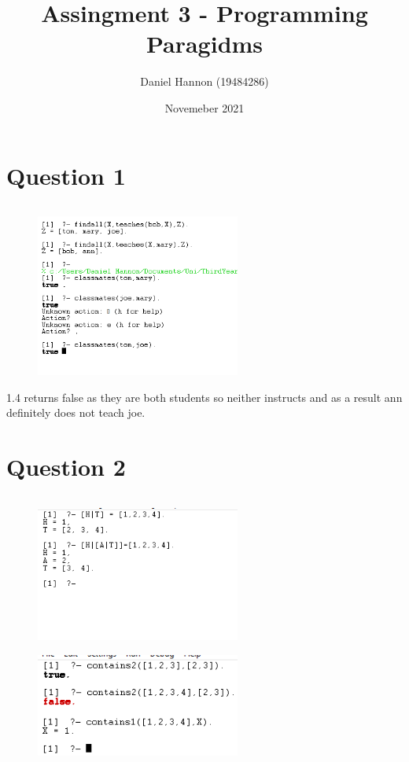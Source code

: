 \documentclass{article}
\title{Assingment 3 - Programming Paragidms }
\author{Daniel Hannon (19484286)}
\date{Novemeber 2021}
\begin{document}
	\maketitle
	\section{Question 1}
	\inputminted{prolog}{question1.pl}
	\begin{figure}[h!]
		\centering
		\includegraphics[width=0.6\textwidth]{question1.png}
	\end{figure}
	1.4 returns false as they are both students so neither instructs and as a result ann definitely does not teach joe.
	\newpage
	\section{Question 2}
	\inputminted{prolog}{question2.pl}
	\begin{figure}[h!]
		\centering
		\includegraphics[width=0.6\textwidth]{question2_1.png}
	\end{figure}
	\begin{figure}[h!]
		\centering
		\includegraphics[width=0.6\textwidth]{question2_2.png}
	\end{figure}
	\newpage
\end{document}
